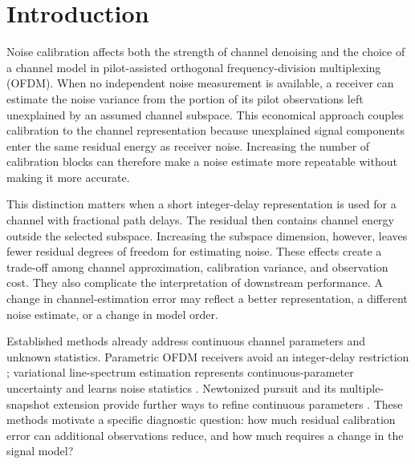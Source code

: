 \section{Introduction}
\label{sec:introduction}

Noise calibration affects both the strength of channel denoising and the
choice of a channel model in pilot-assisted orthogonal frequency-division
multiplexing (OFDM). When no independent noise measurement is available, a
receiver can estimate the noise variance from the portion of its pilot
observations left unexplained by an assumed channel subspace. This economical
approach couples calibration to the channel representation because unexplained
signal components enter the same residual energy as receiver noise. Increasing
the number of calibration blocks can therefore make a noise estimate more
repeatable without making it more accurate.

This distinction matters when a short integer-delay representation is used for
a channel with fractional path delays. The residual then contains channel
energy outside the selected subspace. Increasing the subspace dimension, however,
leaves fewer residual degrees of freedom for estimating noise. These effects
create a trade-off among channel approximation, calibration variance, and
observation cost. They also complicate the interpretation of downstream
performance. A change in channel-estimation error may reflect a
better representation, a different noise estimate, or a change in model order.

Established methods already address continuous channel parameters and unknown
statistics. Parametric OFDM receivers avoid an integer-delay restriction
\cite{hansen2018iterative}; variational line-spectrum estimation represents
continuous-parameter uncertainty and learns noise statistics
\cite{badiu2017valse}. Newtonized pursuit and its multiple-snapshot extension
provide further ways to refine continuous parameters
\cite{mamandipoor2016nomp,zhu2019mnomp}. These methods motivate a specific
diagnostic question: how much residual calibration error can additional
observations reduce, and how much requires a change in the signal model?

